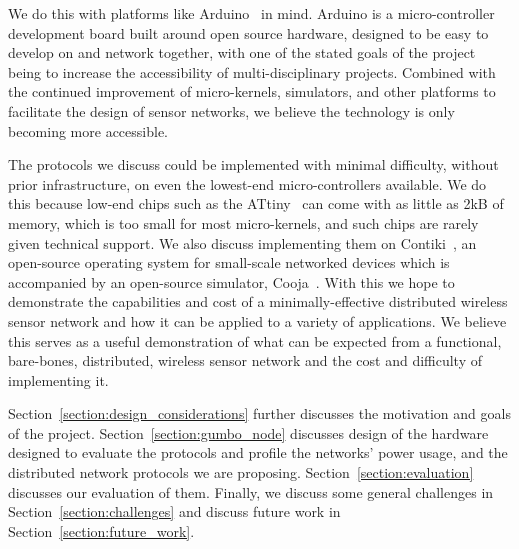 We do this with platforms like Arduino~\cite{arduino} in mind.  Arduino is a micro-controller development board built
around open source hardware, designed to be easy to develop on and network together, with one of the stated goals of
the project being to increase the accessibility of multi-disciplinary projects.  Combined with the continued improvement
of micro-kernels, simulators, and other platforms to facilitate the design of sensor networks, we believe the technology
is only becoming more accessible.

The protocols we discuss could be implemented with minimal difficulty, without prior infrastructure, on even the lowest-end
micro-controllers available.  We do this because low-end chips such as the ATtiny~\cite{attinyds} can come with as little as
2kB of memory, which is too small for most micro-kernels, and such chips are rarely given technical support.  We also discuss
implementing them on Contiki~\cite{contiki},
an open-source operating system for small-scale networked devices which is accompanied by an open-source simulator,
Cooja~\cite{cooja}.  With this we hope to demonstrate the capabilities and cost of a minimally-effective distributed
wireless sensor network and how it can be applied to a variety of applications.  We believe this serves as a useful demonstration
of what can be expected from a functional, bare-bones, distributed, wireless sensor network and the cost and
difficulty of implementing it.

Section~\ref{section:design_considerations} further discusses the motivation and goals of the project.
Section~\ref{section:gumbo_node} discusses design of the hardware designed to evaluate the protocols and profile the networks'
power usage, and the distributed network protocols we are proposing.  Section~\ref{section:evaluation} discusses our evaluation
of them.  Finally, we discuss some general challenges
in Section~\ref{section:challenges} and discuss future work in Section~\ref{section:future_work}.


